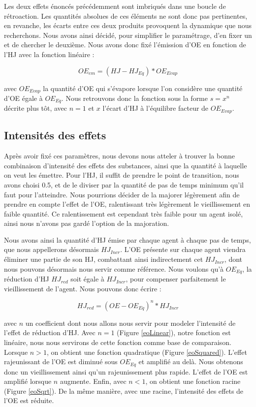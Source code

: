	Les deux effets énoncés précédemment sont imbriqués dans une boucle de rétroaction. Les quantités absolues de ces éléments ne sont donc pas pertinentes, en revanche, les écarts entre ces deux produits provoquent la dynamique que nous recherchons. Nous avons ainsi décidé, pour simplifier le paramétrage, d'en fixer un et de chercher le deuxième. Nous avons donc fixé l'émission d'OE en fonction de l'HJ avec la fonction linéaire :
	
	\begin{equation}
		OE_{em} = (HJ - HJ_{Eq}) * OE_{Evap}
	\label{eoEM}
	\end{equation}

avec $OE_{Evap}$ la quantité d'OE qui s'évapore lorsque l'on considère une quantité d'OE égale à $OE_{Eq}$. Nous retrouvons donc la fonction sous la forme $s=x^n$ décrite plus tôt, avec $n = 1$ et $x$ l'écart d'HJ à l'équilibre facteur de $OE_{Evap}$.
	
	
	\subsection{Intensités des effets}	
	Après avoir fixé ces paramètres, nous devons nous atteler à trouver la bonne combinaison d'intensité des effets des substances, ainsi que la quantité à laquelle on veut les émettre. Pour l'HJ, il suffit de prendre le point de transition, nous avons choisi 0.5, et de le diviser par la quantité de pas de temps minimum qu'il faut pour l'atteindre. Nous pourrions décider de la majorer légèrement afin de prendre en compte l'effet de l'OE, ralentissant très légèrement le vieillissement en faible quantité. Ce ralentissement est cependant très faible pour un agent isolé, ainsi nous n'avons pas gardé l'option de la majoration.
	
	Nous avons ainsi la quantité d'HJ émise par chaque agent à chaque pas de temps, que nous appellerons désormais $HJ_{Incr}$. L'OE présente sur chaque agent viendra éliminer une partie de son HJ, combattant ainsi indirectement cet $HJ_{Incr}$, dont nous pouvons désormais nous servir comme référence. Nous voulons qu'à $OE_{Eq}$, la réduction d'HJ $HJ_{red}$ soit égale à $HJ_{Incr}$, pour compenser parfaitement le vieillissement de l'agent. Nous pouvons donc écrire :
	
	\begin{equation}
		 HJ_{red} = (OE - OE_{Eq})^n * HJ_{Incr}
	\label{hjRED}
	\end{equation}
	
	avec $n$ un coefficient dont nous allons nous servir pour modeler l'intensité de l'effet de réduction d'HJ. Avec $n=1$ (Figure \ref{eoLinear}), notre fonction est linéaire, nous nous servirons de cette fonction comme base de comparaison. Lorsque $n>1$, on obtient une fonction quadratique (Figure \ref{eoSquared}). L'effet rajeunissant de l'OE est diminué sous $OE_{Eq}$ et amplifié au delà. Nous obtenons donc un vieillissement ainsi qu'un rajeunissement plus rapide. L'effet de l'OE est amplifié lorsque $n$ augmente. Enfin, avec $n < 1$, on obtient une fonction racine (Figure \ref{eoSqrt}). De la même manière, avec une racine, l'intensité des effets de l'OE est réduite.
	
